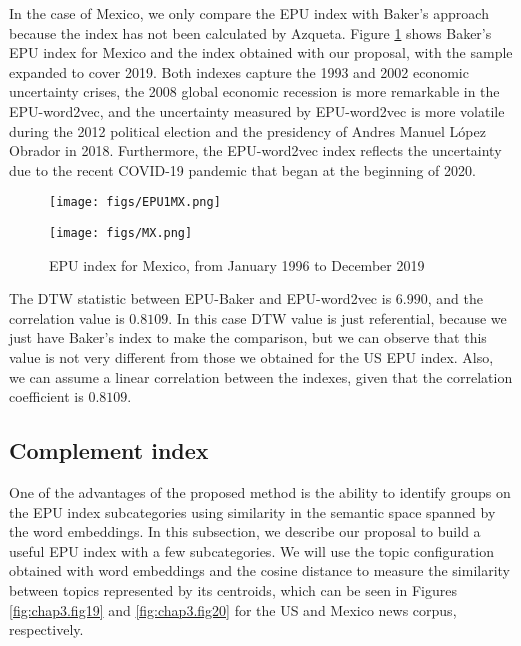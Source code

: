 \documentclass{article}
\begin{document}
In the case of Mexico, we only compare the EPU index with Baker's approach because the index has not been calculated by Azqueta. Figure \ref{fig:chap3.fig29a} shows Baker's EPU index for Mexico and the index obtained with our proposal, with the sample expanded to cover 2019. Both indexes capture the 1993 and 2002 economic uncertainty crises, the 2008 global economic recession is more remarkable in the EPU-word2vec,  and the uncertainty measured by EPU-word2vec is more volatile during the 2012 political election and the presidency of Andres Manuel López Obrador in 2018.  Furthermore, the EPU-word2vec index reflects the uncertainty due to the recent COVID-19 pandemic that began at the beginning of 2020.

\begin{figure}[H] 
    \begin{minipage}[b]{0.5\linewidth}
    \centering
    \centering
    \texttt{[image: figs/EPU1MX.png]}
    \vspace{1ex}
    \end{minipage}
    \begin{minipage}[b]{0.5\linewidth}
    \centering
    \centering
    \texttt{[image: figs/MX.png]}
    \vspace{1ex}
    \end{minipage}
    \caption{EPU index for Mexico, from January 1996 to December 2019}    
    \label{fig:chap3.fig29a}
\end{figure}

The DTW statistic between EPU-Baker and EPU-word2vec is $6.990$, and the correlation value is $0.8109$. In this case DTW value is just referential, because we just have Baker's index to make the comparison, but we can observe that this value is not very different from those we obtained for the US EPU index. Also, we can assume a linear correlation between the indexes, given that the correlation coefficient is $0.8109$. 

\subsection{Complement index} 
\label{Complement index}

One of the advantages of the proposed method is the ability to identify groups on the EPU index subcategories using similarity in the semantic space spanned by the word embeddings. In this subsection, we describe our proposal to build a useful EPU index with a few subcategories. We will use the topic configuration obtained with word embeddings and the cosine distance to measure the similarity between topics represented by its centroids, which can be seen in Figures \ref{fig:chap3.fig19} and \ref{fig:chap3.fig20} for the US and Mexico news corpus, respectively.
\end{document}
